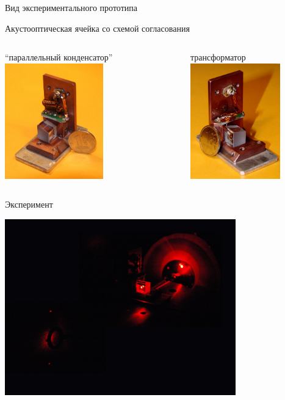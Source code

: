 \documentclass[ignorenonframetext,hyperref={pdftex,unicode}]{beamer}
\begin{document}
%
\begin{frame}{Вид экспериментального прототипа}
  \begin{block}{Акустооптическая ячейка со схемой согласования}
    \begin{columns}
      \begin{column}{5.5cm}
        \begin{center}
          ``параллельный конденсатор''
          \includegraphics[height=5cm]{pictures/cell_crystal_view.jpg}
        \end{center}
      \end{column}
      \begin{column}{5.5cm}
        \begin{center}
          трансформатор
          \includegraphics[height=5cm]{pictures/cell_transformator_match.jpg}
        \end{center}
      \end{column}
    \end{columns}
  \end{block}
\end{frame}
%
\begin{frame}{Эксперимент}
  \begin{center}
    \includegraphics[width=10cm]{pictures/experiment.jpg}
    \end{center}
\end{frame}
\end{document}
